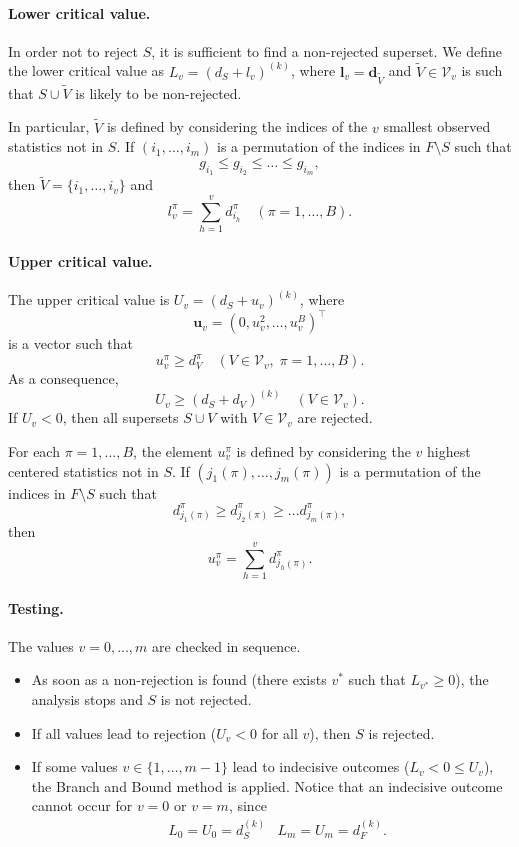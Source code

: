 \documentclass[11pt,a4paper,openright,twoside]{article}
\begin{document}
\paragraph{Lower critical value.} In order not to reject $S$, it is sufficient to find a non-rejected superset. We define the lower critical value as $L_v=(d_{S} + l_v)^{(k)}$, where $\mathbf{l}_v=\mathbf{d}_{\tilde{V}}$ and $\tilde{V}\in\mathcal{V}_v$ is such that $S\cup\tilde{V}$ is likely to be non-rejected.

In particular, $\tilde{V}$ is defined by considering the indices of the $v$ smallest observed statistics not in $S$. If $(i_1,\ldots,i_m)$ is a permutation of the indices in $F\setminus S$ such that
\[g_{i_1}\leq g_{i_2}\leq\ldots\leq g_{i_m},\]
then $\tilde{V}=\{i_1,\ldots,i_v\}$ and
\[l_v^\pi = \sum_{h=1}^v d_{i_h}^\pi\quad (\pi=1,\ldots,B).\]



\paragraph{Upper critical value.} The upper critical value is $U_v=(d_{S} + u_v)^{(k)}$, where
\[\mathbf{u}_v=(0,u_v^2,\ldots,u_v^B)^\top\]
is a vector such that
\[u_v^\pi\geq d_V^\pi\quad (V\in\mathcal{V}_v,\;\pi=1,\ldots,B).\]
As a consequence,
\[U_v \geq (d_S + d_V)^{(k)}\quad (V\in\mathcal{V}_v).\]
If $U_v<0$, then all supersets $S\cup V$ with $V\in\mathcal{V}_v$ are rejected.

For each $\pi=1,\ldots,B$, the element $u_v^\pi$ is defined by considering the $v$ highest centered statistics not in $S$. If $(j_1(\pi),\ldots,j_m(\pi))$ is a permutation of the indices in $F\setminus S$ such that
\[d_{j_1(\pi)}^\pi\geq d_{j_2(\pi)}^\pi\geq\ldots d_{j_m(\pi)}^\pi ,\]
then
\[u_v^\pi=\sum_{h=1}^v d_{j_h(\pi)}^\pi.\]




\paragraph{Testing.}
The values $v=0,\ldots, m$ are checked in sequence.
\begin{itemize}
\item As soon as a non-rejection is found (there exists $v^*$ such that $L_{v^*}\geq 0$), the analysis stops and $S$ is not rejected.
\item If all values lead to rejection ($U_v<0$ for all $v$), then $S$ is rejected.
\item If some values $v\in \{1,\ldots,m-1\}$ lead to indecisive outcomes ($L_v < 0\leq U_v$), the Branch and Bound method is applied. Notice that an indecisive outcome cannot occur for $v=0$ or $v=m$, since
\begin{align*}
& L_0=U_0=d_S^{(k)} & L_m=U_m=d_F^{(k)}.
\end{align*}
\end{itemize}
\end{document}
